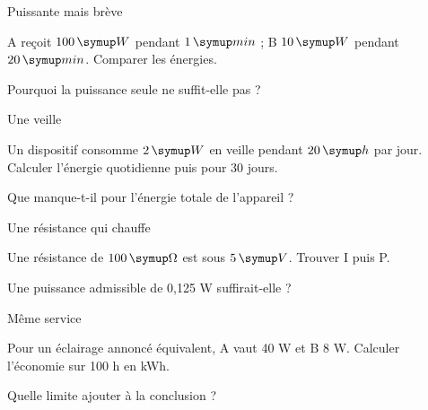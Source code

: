 \par\noindent\begin{minipage}{\linewidth}
\begin{exercice}[3]{Puissante mais brève}
\begin{questions}
\item A reçoit $100\unite W$ pendant $1\unite{min}$ ; B $10\unite W$ pendant $20\unite{min}$. Comparer les énergies.
\item Pourquoi la puissance seule ne suffit-elle pas ?
\end{questions}
\end{exercice}
\end{minipage}
\par\noindent\begin{minipage}{\linewidth}
\begin{exercice}[3]{Une veille}
\begin{questions}
\item Un dispositif consomme $2\unite W$ en veille pendant $20\unite h$ par jour. Calculer l’énergie quotidienne puis pour 30 jours.
\item Que manque-t-il pour l’énergie totale de l’appareil ?
\end{questions}
\end{exercice}
\end{minipage}
\par\noindent\begin{minipage}{\linewidth}
\begin{exercice}[3]{Une résistance qui chauffe}
\begin{questions}
\item Une résistance de $100\unite\Omega$ est sous $5\unite V$. Trouver I puis P.
\item Une puissance admissible de 0,125 W suffirait-elle ?
\end{questions}
\end{exercice}
\end{minipage}
\par\noindent\begin{minipage}{\linewidth}
\begin{exercice}[3]{Même service}
\begin{questions}
\item Pour un éclairage annoncé équivalent, A vaut 40 W et B 8 W. Calculer l’économie sur 100 h en kWh.
\item Quelle limite ajouter à la conclusion ?
\end{questions}
\end{exercice}
\end{minipage}
